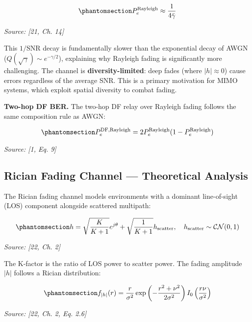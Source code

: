 \begin{equation}\protect\phantomsection\label{eq:rayleigh-ber-approx}{P_e^{\text{Rayleigh}} \approx \frac{1}{4\bar{\gamma}}
}\end{equation} \par{\small\textit{Source: [21, Ch. 14]}}

This \(1/\text{SNR}\) decay is fundamentally slower than the exponential decay of AWGN (\(Q(\sqrt{\gamma}) \sim e^{-\gamma/2}\)), explaining why Rayleigh fading is significantly more challenging. The channel is \textbf{diversity-limited}: deep fades (where \(|h| \approx 0\)) cause errors regardless of the average SNR. This is a primary motivation for MIMO systems, which exploit spatial diversity to combat fading.

\textbf{Two-hop DF BER.} The two-hop DF relay over Rayleigh fading follows the same composition rule as AWGN:

\begin{equation}\protect\phantomsection\label{eq:df-ber-rayleigh}{P_e^{\text{DF,Rayleigh}} = 2P_e^{\text{Rayleigh}}(1 - P_e^{\text{Rayleigh}})
}\end{equation} \par{\small\textit{Source: [1, Eq. 9]}}


\subsection{Rician Fading Channel --- Theoretical Analysis}\label{sec:rician-fading-channel-theoretical-analysis}

The Rician fading channel models environments with a dominant line-of-sight (LOS) component alongside scattered multipath:

\begin{equation}\protect\phantomsection\label{eq:rician-channel}{h = \sqrt{\frac{K}{K+1}} e^{j\theta} + \sqrt{\frac{1}{K+1}} h_{\text{scatter}}, \quad h_{\text{scatter}} \sim \mathcal{CN}(0, 1)
}\end{equation} \par{\small\textit{Source: [22, Ch. 2]}}

The K-factor is the ratio of LOS power to scatter power. The fading amplitude \(|h|\) follows a Rician distribution:

\begin{equation}\protect\phantomsection\label{eq:rician-pdf}{f_{|h|}(r) = \frac{r}{\sigma^2} \exp\left(-\frac{r^2 + \nu^2}{2\sigma^2}\right) I_0\left(\frac{r\nu}{\sigma^2}\right)
}\end{equation} \par{\small\textit{Source: [22, Ch. 2, Eq. 2.6]}}

